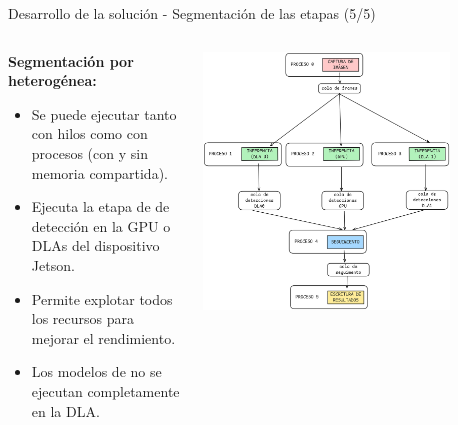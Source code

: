 \documentclass[spanish]{beamer}
\begin{document}
\begin{frame}{Desarrollo de la solución - Segmentación de las etapas (5/5)}
    \begin{columns}
        \begin{column}{0.5\textwidth}
            \textbf{Segmentación por heterogénea:}
            \begin{itemize}
                \item Se puede ejecutar tanto con hilos como con procesos (con y sin memoria compartida).
                \item Ejecuta la etapa de de detección en la GPU o DLAs del dispositivo Jetson.
                \item Permite explotar todos los recursos para mejorar el rendimiento.
                \item Los modelos de no se ejecutan completamente en la DLA.
            \end{itemize}
        \end{column}
        \begin{column}{0.5\textwidth}
            \begin{center}
                \includegraphics[width=0.8\textwidth]{images/solucion_propuesta/segmentacion_multihardware.png}
            \end{center}
        \end{column}
    \end{columns}
\end{frame}
\end{document}
